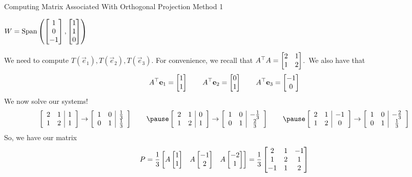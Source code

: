\documentclass[xcoler=dvipsnames, aspectratio=169]{beamer}
\begin{document}
    \begin{frame}{Computing Matrix Associated With Orthogonal Projection Method 1}
        \footnotesize
        \begin{center}
            $W=\text{Span}\left(\begin{bmatrix}1\\0\\-1\end{bmatrix}, \begin{bmatrix}1\\1\\0\end{bmatrix}\right)$
        \end{center}
        We need to compute $T(\vec{e}_1),T(\vec{e}_2),T(\vec{e}_3)$. For convenience, we recall that
        $A^\top A=\begin{bmatrix}2&1\\1&2\end{bmatrix}$.\pause\ We also have that
        \[
            A^\top\mathbf{e}_1 = \begin{bmatrix}1\\1\end{bmatrix}\qquad A^\top\mathbf{e}_2 = \begin{bmatrix}0\\1\end{bmatrix}\qquad A^\top\mathbf{e}_3 = \begin{bmatrix}-1\\0\end{bmatrix}
        \]\pause
        We now solve our systems!
        \[
            \aMat{cc|c}{
                2 & 1 & 1\\
                1 & 2 & 1
            }\rightarrow\aMat{cc|c}{
                1 & 0 & \frac{1}{3}\\
                0 & 1 & \frac{1}{3}
            }\qquad\pause\aMat{cc|c}{
                2 & 1 & 0\\
                1 & 2 & 1
            }\rightarrow\aMat{cc|c}{
                1 & 0 & -\frac{1}{3}\\
                0 & 1 & \frac{2}{3}
            }\qquad\pause\aMat{cc|c}{
                2 & 1 &-1\\
                1 & 2 & 0
            }\rightarrow\aMat{cc|c}{
                1 & 0 & -\frac{2}{3}\\
                0 & 1 & \frac{1}{3}
            }
        \]
        So, we have our matrix
        \[
            P = \frac{1}{3}\begin{bmatrix}A\begin{bmatrix}1\\1\end{bmatrix} & A\begin{bmatrix}-1\\2\end{bmatrix} & A\begin{bmatrix}-2\\1\end{bmatrix}\end{bmatrix} = \frac{1}{3}\begin{bmatrix}
                2 & 1 & -1\\
                1 & 2 & 1 \\
                -1& 1 & 2
            \end{bmatrix}
        \]
    \end{frame}
\end{document}

